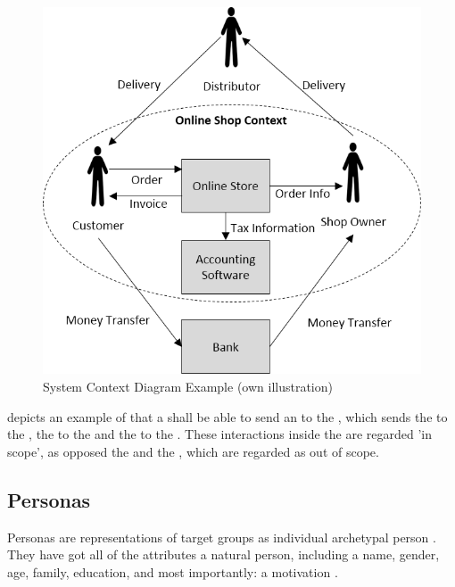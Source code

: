 \begin{figure}[H]
    \centering
    \includegraphics[height=.5\textheight]{img/SystemContextExample.png}
    \caption[System Context Diagram Example]{System Context Diagram Example (own illustration)}
    \label{fig:scEx}
\end{figure}

depicts an example of that a  shall be able to send an  to the , which sends the  to the , the  to the  and the  to the . These interactions inside the  are regarded 'in scope', as opposed the  and the , which are regarded as out of scope.

\subsection{Personas \label{ssec:personas}}

Personas are representations of target groups as individual archetypal person \parencite[cf.][81]{Cooper.2007}. They have got all of the attributes a natural person, including a name, gender, age, family, education, and most importantly: a motivation \parencites[cf.][]{Platt.2016}[cf.][83-84]{Cooper.2007}. 

